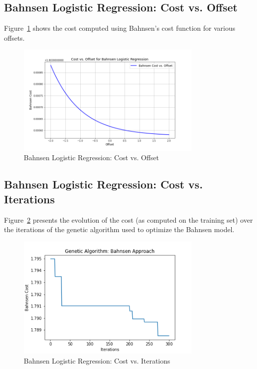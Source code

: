 \documentclass[11pt]{article}
\begin{document}
\subsection{Bahnsen Logistic Regression: Cost vs. Offset}
Figure~\ref{fig:bahnsen_offset} shows the cost computed using Bahnsen's cost function for various offsets.
\begin{figure}
    \centering
    \includegraphics[width=0.8\textwidth]{../bahnsen_cost_vs_offset.png}
    \caption{Bahnsen Logistic Regression: Cost vs. Offset}
    \label{fig:bahnsen_offset}
\end{figure}

\subsection{Bahnsen Logistic Regression: Cost vs. Iterations}
Figure~\ref{fig:bahnsen_iterations} presents the evolution of the cost (as computed on the training set) over the iterations of the genetic algorithm used to optimize the Bahnsen model.
\begin{figure}
    \centering
    \includegraphics[width=0.8\textwidth]{../bahnsen_plot.png}
    \caption{Bahnsen Logistic Regression: Cost vs. Iterations}
    \label{fig:bahnsen_iterations}
\end{figure}
\end{document}
